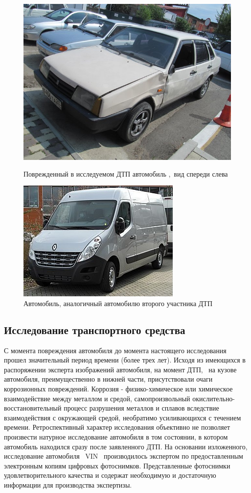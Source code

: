 \begin{figure}[h!]\centering
	\parbox[t]{0.49\textwidth}
	{\centering
		\includegraphics[width=.49\textwidth]{images/tc1}
		\caption{\footnotesize {Поврежденный в исследуемом ДТП автомобиль ,\, вид спереди слева}}
		\label{ris:images/b3}}
	\hfil \hfil
	\parbox[t]{0.49\textwidth}
	{\centering
		\includegraphics[width=.49\textwidth]{images/tb1}
		\caption{\footnotesize {Автомобиль, аналогичный автомобилю второго участника ДТП \tcb}}
		\label{ris:images/b4}}
\end{figure}



\subsection{Исследование транспортного средства}
%
С момента повреждения автомобиля до момента настоящего исследования прошел значительный период времени (более трех лет). Исходя из имеющихся в распоряжении эксперта изображений автомобиля, на момент ДТП, \, на кузове автомобиля, преимущественно в нижней части, присутствовали  очаги коррозионных повреждений. Коррозия - физико-химическое или химическое взаимодействие между металлом и средой,  самопроизвольный окислительно-восстановительный процесс разрушения металлов и сплавов вследствие взаимодействия с окружающей средой,   необратимо усиливающихся с течением времени.  Ретроспективный характер исследования объективно не позволяет произвести натурное исследование автомобиля в том состоянии, в котором  автомобиль находился сразу  после заявленного ДТП.  На основании изложенного, исследование автомобиля \, VIN \, производилось экспертом по предоставленным электронным копиям цифровых фотоснимков. Представленные фотоснимки удовлетворительного качества и содержат необходимую и достаточную информации для производства экспертизы.


